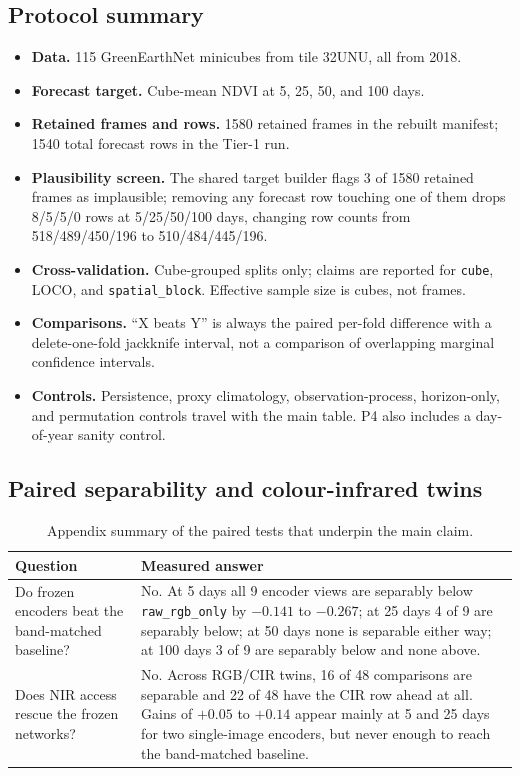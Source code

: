 \subsection{Protocol summary}
\begin{itemize}
\item \textbf{Data.} 115 GreenEarthNet minicubes from tile 32UNU, all from 2018.
\item \textbf{Forecast target.} Cube-mean NDVI at 5, 25, 50, and 100 days.
\item \textbf{Retained frames and rows.} 1580 retained frames in the rebuilt
manifest; 1540 total forecast rows in the Tier-1 run.
\item \textbf{Plausibility screen.} The shared target builder flags 3 of 1580
retained frames as implausible; removing any forecast row touching one of them
drops 8/5/5/0 rows at 5/25/50/100 days, changing row counts from
518/489/450/196 to 510/484/445/196.
\item \textbf{Cross-validation.} Cube-grouped splits only; claims are reported for
\texttt{cube}, LOCO, and \texttt{spatial\_block}. Effective sample size is
cubes, not frames.
\item \textbf{Comparisons.} ``X beats Y'' is always the paired per-fold difference
with a delete-one-fold jackknife interval, not a comparison of overlapping
marginal confidence intervals.
\item \textbf{Controls.} Persistence, proxy climatology, observation-process,
horizon-only, and permutation controls travel with the main table. P4 also
includes a day-of-year sanity control.
\end{itemize}

\subsection{Paired separability and colour-infrared twins}
\begin{table}[h]
\centering
\footnotesize
\begin{tabular}{@{}>{\raggedright\arraybackslash}p{}>{\raggedright\arraybackslash}p{}@{}}
\toprule
Question & Measured answer \\
\midrule
Do frozen encoders beat the band-matched baseline? & No. At 5 days all 9 encoder views are separably below \texttt{raw\_rgb\_only} by $-0.141$ to $-0.267$; at 25 days 4 of 9 are separably below; at 50 days none is separable either way; at 100 days 3 of 9 are separably below and none above. \\
Does NIR access rescue the frozen networks? & No. Across RGB/CIR twins, 16 of 48 comparisons are separable and 22 of 48 have the CIR row ahead at all. Gains of $+0.05$ to $+0.14$ appear mainly at 5 and 25 days for two single-image encoders, but never enough to reach the band-matched baseline. \\
\bottomrule
\end{tabular}
\caption{Appendix summary of the paired tests that underpin the main claim.}
\label{tab:paired}
\end{table}


